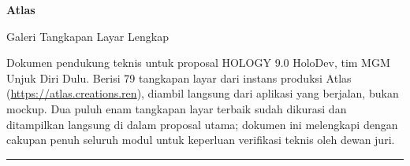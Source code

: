\documentclass[9pt,a4paper]{article}
\begin{document}
\thispagestyle{empty}
\vspace*{1.2cm}
{\Huge\bfseries\textcolor{fcsblue}{Atlas}}

\vspace{0.3cm}
{\Large Galeri Tangkapan Layar Lengkap}

\vspace{0.4cm}
Dokumen pendukung teknis untuk proposal HOLOGY 9.0 HoloDev, tim MGM Unjuk Diri Dulu. Berisi 79 tangkapan layar dari instans produksi Atlas (\url{https://atlas.creations.ren}), diambil langsung dari aplikasi yang berjalan, bukan mockup. Dua puluh enam tangkapan layar terbaik sudah dikurasi dan ditampilkan langsung di dalam proposal utama; dokumen ini melengkapi dengan cakupan penuh seluruh modul untuk keperluan verifikasi teknis oleh dewan juri.

\vspace{0.4cm}
\noindent\textcolor{fcsblue!30}{\rule{\linewidth}{0.8pt}}


\end{document}
